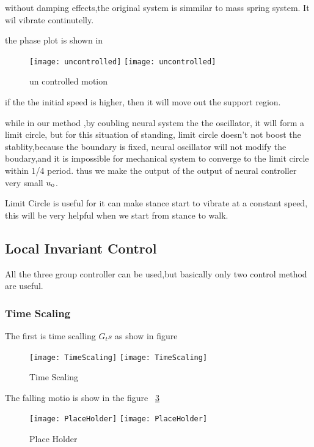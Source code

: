 without damping effects,the original system is simmilar to mass spring system.
It wil vibrate continutelly.

the phase plot is shown in
\begin{figure}[!htbp]
  \begin{center}
    \leavevmode
    \ifpdf
      \texttt{[image: uncontrolled]}
    \else
      \texttt{[image: uncontrolled]}
    \fi
    \caption{un controlled motion}
    \label{fig:stancepostures}
\end{center}
\end{figure}

if the the initial speed is higher, then it will move out the support region.



while in our method ,by coubling neural system the the oscillator, it will form a limit circle,
but for this situation of standing, limit circle doesn't not boost the stablity,because the boundary is fixed,
neural oscillator will not modify the boudary,and it is impossible for mechanical system to converge to the limit circle within 1/4 period.
thus we make the output of the output of neural controller very small $u_{\mathrm{o}}$.

Limit Circle is useful for it can make stance start to vibrate at a constant speed, this will be very helpful when we start from stance to walk.

\subsection{Local Invariant Control}
All the three group controller can be used,but basically only two control method are useful.
\subsubsection*{Time Scaling}
The first is time scalling $G_ts$
as show in figure
\begin{figure}[!htbp]
  \begin{center}
    \leavevmode
    \ifpdf
      \texttt{[image: TimeScaling]}
    \else
      \texttt{[image: TimeScaling]}
    \fi
    \caption{Time Scaling}
    \label{fig:stanceTimeScaling}
\end{center}
\end{figure}

The falling motio is show in the figure ~\ref{fig:stancefall}
\begin{figure}[!htbp]
  \begin{center}
    \leavevmode
    \ifpdf
      \texttt{[image: PlaceHolder]}
    \else
      \texttt{[image: PlaceHolder]}
    \fi
    \caption{Place Holder}
    \label{fig:stancefall}
\end{center}
\end{figure}

